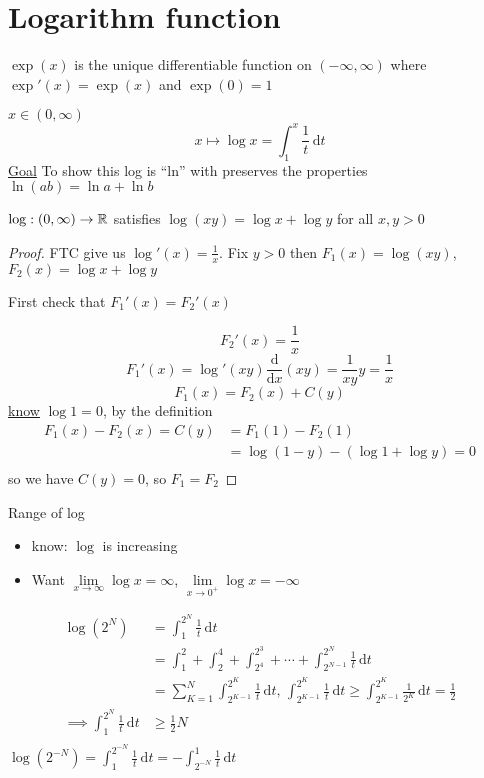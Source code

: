 \section{Logarithm function}

\begin{definition*}
  $\exp(x)$ is the unique differentiable function on $(-\infty, \infty)$  
  where $\exp'(x) = \exp(x)$ and $\exp(0) = 1$
\end{definition*}

\begin{example*}
  $x \in (0, \infty)$
  \[x \mapsto \log x = \int_1^x \frac{1}{t}\,\mathrm{d}t\]
  \underline{Goal} To show this log is ``ln'' with preserves the properties $\ln(ab) = \ln a + \ln b$
\end{example*}

\begin{theorem*}
  $\log : (0, \infty) \to \mathbb R$ satisfies $\log(xy) = \log x + \log y$ for all $x, y > 0$
\end{theorem*}

\begin{proof}
  FTC give us $\log'(x) = \frac{1}{x}$.
  Fix $y > 0$ then $F_1(x) = \log(xy)$, $F_2(x) = \log x + \log y$

  First check that $F_1'(x) = F_2'(x)$

  \[F_2'(x) = \frac{1}{x}\]
  \[F_1'(x) = \log'(xy) \frac{\mathrm{d}}{\mathrm{d}x}(xy) = \frac{1}{xy}y=\frac{1}{x}\]
  \[F_1(x) = F_2(x) + C(y)\]
  \underline{know} $\log 1 = 0$, by the definition
  \begin{align*}
    F_1(x) - F_2(x) = C(y) &= F_1(1) - F_2(1) \\
    &= \log(1-y) - (\log 1 + \log y)  = 0\\
  \end{align*}
  so we have $C(y) = 0$, so $F_1 = F_2$
\end{proof}

Range of log
\begin{itemize}
  \item know: $\log$ is increasing
  \item Want $\lim\limits_{x\to \infty} \log x = \infty$, $\lim\limits_{x\to 0^+} \log x = -\infty$
\end{itemize}
\begin{align*}
  \log(2^N) &= \int_1^{2^N} \frac{1}{t}\,\mathrm{d}t \\
  &= \int_1^2 + \int_2^4 + \int_{2^4}^{2^3} + \cdots + \int_{2^{N-1}}^{2^N} \frac{1}{t}\,\mathrm{d}t\\
  &= \sum_{K=1}^N \int_{2^{K-1}}^{2^K} \frac{1}{t}\,\mathrm{d}t,\, \int_{2^{K-1}}^{2^K} \frac{1}{t}\,\mathrm{d}t \ge \int_{2^{K-1}}^{2^K} \frac{1}{2^K}\,\mathrm{d}t =\frac{1}{2}\\
  \implies \int_1^{2^N} \frac{1}{t}\,\mathrm{d}t &\ge \frac{1}{2}N\\
\end{align*}
$\displaystyle\log(2^{-N}) = \int_1^{2^{-N}} \frac{1}{t}\,\mathrm{d}t =-\int_{2^{-N}}^1 \frac{1}{t}\,\mathrm{d}t$

